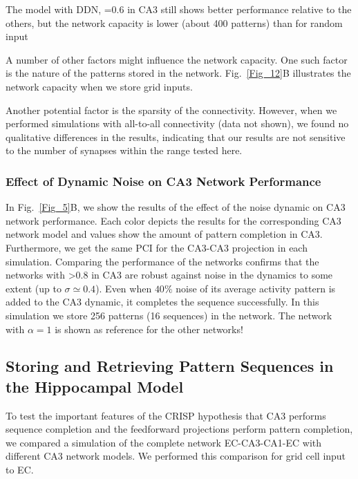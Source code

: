 \documentclass[utf8]{frontiersSCNS} %
\begin{document}
The model with DDN, =0.6 in CA3 still shows better performance relative to the others, but the network capacity is lower (about 400 patterns) than for random input

A number of other factors might influence the network capacity. One such factor is the nature of the patterns stored in the network. Fig.~\ref{Fig_12}B illustrates the network capacity when we store grid inputs. 

Another potential factor is the sparsity of the connectivity. However, when we performed simulations with all-to-all connectivity (data not shown), we found no qualitative differences in the results, indicating that our results are not sensitive to the number of synapses within the range tested here. 

\subsubsection{Effect of Dynamic Noise on CA3 Network Performance}

In Fig.~\ref{Fig_5}B, we show the results of the effect of the noise dynamic on CA3 network performance. Each color depicts the results for the corresponding CA3 network model and values show the amount of pattern completion in CA3.
Furthermore, we get the same PCI for the CA3-CA3 projection in each simulation.
Comparing the performance of the networks confirms that the networks with >0.8 in CA3 are robust against noise in the dynamics to some extent (up to $\sigma \simeq 0.4$). Even when $ 40 \% $ noise of its average activity pattern is added to the CA3 dynamic, it completes the sequence successfully. In this simulation we store 256 patterns (16 sequences) in the network. The network with $\alpha = 1$ is shown as reference for the other networks!    


\subsection{Storing and Retrieving Pattern Sequences in the Hippocampal Model}

To test the important features of the CRISP hypothesis that CA3 performs sequence completion and the feedforward projections perform pattern completion, we compared a simulation of the complete network EC-CA3-CA1-EC with different CA3 network models. We performed this comparison for grid cell input to EC. 
\end{document}
